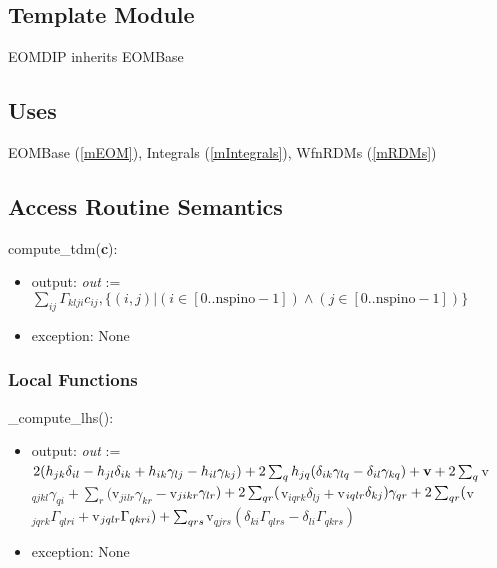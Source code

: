 \documentclass[12pt, titlepage]{article}
\begin{document}
\subsection{Template Module}

EOMDIP inherits EOMBase

\subsection{Uses}
EOMBase (\ref{mEOM}), Integrals (\ref{mIntegrals}), WfnRDMs (\ref{mRDMs})

\subsection{Access Routine Semantics}
\noindent compute\_tdm(\textbf{c}):
\begin{itemize}
	\item output: \textit{out} := $\sum_{ij}\Gamma_{klji} c_{ij}, \{(i,j)|(i\in 
	[0..\text{nspino}-1]) \land (j\in 
	[0..\text{nspino}-1])\}$
	\item exception: None
\end{itemize}

\subsubsection{Local Functions}
\noindent \_compute\_lhs():
\begin{itemize}
	\item output: \textit{out} := \\
	$2(h_{jk}\delta_{il} -h_{jl} \delta_{ik} 
	+ h_{ik} \gamma_{lj} - h_{il}\gamma_{kj})\\
	+ 2 \sum_{q} h_{jq}( \delta_{ik} \gamma_{lq} - \delta_{il} \gamma_{kq})
	+ \mathbf{v} \\+ 2 \sum_{q}  $v$_{qjkl} \gamma_{qi}
	+ \sum_{r} ($v$_{jilr} \gamma_{kr} - 
	$v$_{jikr} \gamma_{lr})\\
	+ 2 \sum_{qr} ($v$_{iqrk}  \delta_{lj} + $v$_{iqlr} 
	\delta_{kj})\gamma_{qr}\\
	+ 2 \sum_{qr} ($v$_{jqrk}\Gamma_{qlri} + 
	$v$_{jqlr}\Gamma_{qkri})\\
	+ \sum_{qrs} $v$_{qjrs}(\delta_{ki}\Gamma_{qlrs} - 
	\delta_{li}\Gamma_{qkrs})$
	\item exception: None 
\end{itemize}
\end{document}
